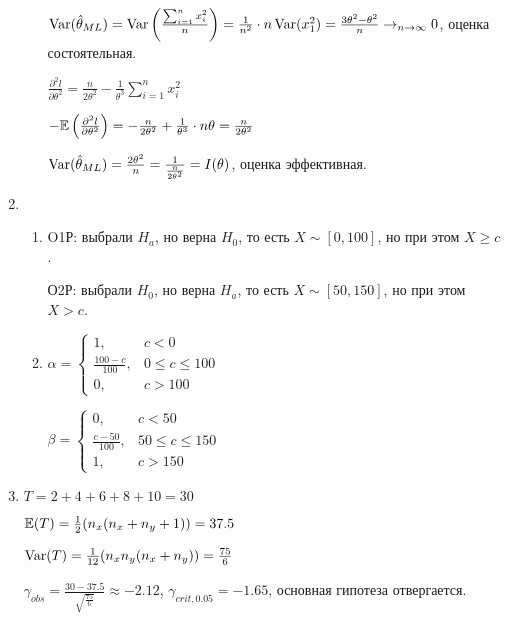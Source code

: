 \begin{enumerate}
\begin{enumerate}
$\operatorname{Var}(\hat{\theta}_{ML}) = \operatorname{Var}\left(\frac{\sum_{i=1}^n x_i^2}{n}\right) = \frac{1}{n^2}\cdot n \operatorname{Var}(x_1^2) = \frac{3\theta^2 - \theta^2}{n}\to_{n\to\infty} 0$,
оценка состоятельная.

$\frac{\partial^2 l}{\partial \theta^2} = \frac{n}{2 \theta^2} - \frac{1}{\theta^3}\sum_{i=1}^n x_i^2$

$-\mathbb{E}\left(\frac{\partial^2 l}{\partial \theta^2}\right) = -\frac{n}{2 \theta^2} + \frac{1}{\theta^3} \cdot n \theta = \frac{n}{2 \theta^2}$

$\operatorname{Var}(\hat{\theta}_{ML}) = \frac{2\theta^2}{n} = \frac{1}{\frac{n}{2 \theta^2}} = I(\theta)$,
оценка эффективная.
\end{enumerate}
\item
\begin{enumerate}
\item O1Р: выбрали $H_a$, но верна $H_0$, то есть $X \sim [0, 100]$, но при этом $X \geq c$.

О2Р: выбрали $H_0$, но верна $H_a$, то есть $X \sim [50, 150]$, но при этом $X > c$.
\item $\alpha = \begin{cases}
1, & c < 0 \\
\frac{100-c}{100}, & 0 \leq c \leq 100 \\
0, & c > 100
\end{cases}$

$\beta = \begin{cases}
0, & c < 50 \\
\frac{c-50}{100}, & 50 \leq c \leq 150 \\
1, & c > 150
\end{cases}$
\end{enumerate}
\item $T = 2 + 4 + 6 + 8 + 10 = 30$

$\mathbb{E}(T) = \frac{1}{2}(n_x(n_x+n_y+1)) = 37.5$

$\operatorname{Var}(T) = \frac{1}{12}(n_x n_y(n_x + n_y)) = \frac{75}{6}$

$\gamma_{obs} = \frac{30-37.5}{\sqrt{\frac{75}{6}}} \approx -2.12$,
$\gamma_{crit, 0.05} = -1.65$, основная гипотеза отвергается.


\end{enumerate}
